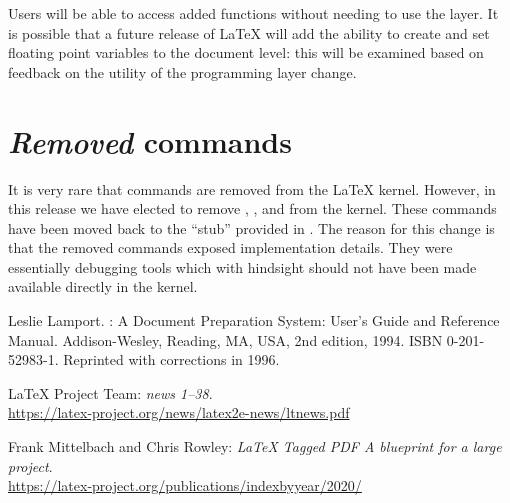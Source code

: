 \documentclass{ltnews}
\providecommand\Dash {\unskip \textemdash}
\begin{document}
Users will be able to access added functions without needing to use the
 layer. It is possible that a future release of \LaTeX{} will
add the ability to create and set floating point variables to the
document level: this will be examined based on feedback on the
utility of the programming layer change.


\section{\emph{Removed} commands}

It is very rare that commands are removed from the \LaTeX{} kernel. However, in
this release we have elected to remove ,
,  and
 from the kernel. These commands have been
moved back to the \enquote{stub}  provided in . The
reason for this change is that the removed commands exposed implementation
details. They were essentially debugging tools which with hindsight should
not have been made available directly in the kernel.






\begin{thebibliography}{9}



Leslie Lamport.
\newblock {\LaTeX}: {A} Document Preparation System: User's Guide and Reference
  Manual.
\newblock \mbox{Addison}-Wesley, Reading, MA, USA, 2nd edition, 1994.
\newblock ISBN 0-201-52983-1.
\newblock Reprinted with corrections in 1996.


 \LaTeX{} Project Team:
  \emph{\LaTeXe{} news 1--38}.\\
  \url{https://latex-project.org/news/latex2e-news/ltnews.pdf}

 Frank Mittelbach and Chris Rowley:
  \emph{\LaTeX{} Tagged PDF \Dash A blueprint for a large project}.\\
  \url{https://latex-project.org/publications/indexbyyear/2020/}



\end{thebibliography}
\end{document}
